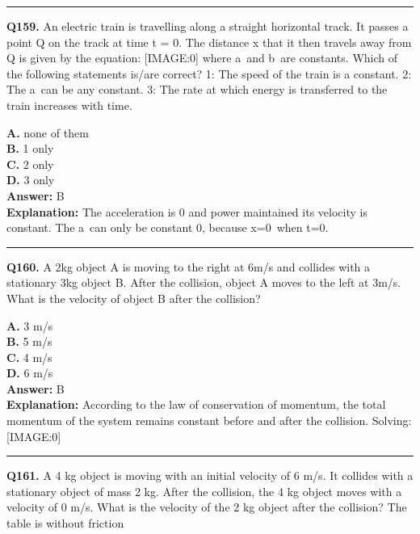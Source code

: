 \documentclass[12pt]{article}
\begin{document}
\hrule
\vspace{1em}


\noindent
\textbf{Q159.} An electric train is travelling along a straight horizontal track. It passes a point Q on the track at time t = 0. The distance x that it then travels away from Q is given by the equation:
[IMAGE:0]
where a and b are constants.
Which of the following statements is/are correct?
1: The speed of the train is a constant.
2: The a can be any constant.
3: The rate at which energy is transferred to the train increases with time.



\textbf{A.} none of them \\
\textbf{B.} 1 only \\
\textbf{C.} 2 only \\
\textbf{D.} 3 only \\

\textbf{Answer:} B \\
\textbf{Explanation:} The acceleration is 0 and power maintained its velocity is constant.
The a can only be constant 0, because x=0 when t=0.

\hrule
\vspace{1em}


\noindent
\textbf{Q160.} A 2kg object A is moving to the right at 6m/s and collides with a stationary 3kg object B. After the collision, object A moves to the left at 3m/s. What is the velocity of object B after the collision?



\textbf{A.} 3 m/s \\
\textbf{B.} 5 m/s \\
\textbf{C.} 4 m/s \\
\textbf{D.} 6 m/s \\

\textbf{Answer:} B \\
\textbf{Explanation:} According to the law of conservation of momentum, the total momentum of the system remains constant before and after the collision.
Solving:
[IMAGE:0]

\hrule
\vspace{1em}


\noindent
\textbf{Q161.} A 4 kg object is moving with an initial velocity of 6 m/s. It collides with a stationary object of mass 2 kg. After the collision, the 4 kg object moves with a velocity of 0 m/s. What is the velocity of the 2 kg object after the collision? The table is without friction
\end{document}
